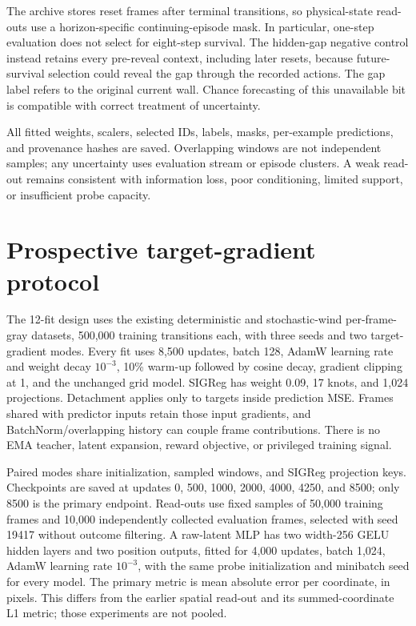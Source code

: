 The archive stores reset frames after terminal transitions, so physical-state read-outs use a
horizon-specific continuing-episode mask. In particular, one-step evaluation does not select for
eight-step survival. The hidden-gap negative control instead retains every pre-reveal context,
including later resets, because future-survival selection could reveal the gap through the recorded
actions. The gap label refers to the original current wall. Chance forecasting of this unavailable
bit is compatible with correct treatment of uncertainty.

All fitted weights, scalers, selected IDs, labels, masks, per-example predictions, and provenance
hashes are saved. Overlapping windows are not independent samples; any uncertainty uses evaluation
stream or episode clusters. A weak read-out remains consistent with information loss, poor
conditioning, limited support, or insufficient probe capacity.

\section{Prospective target-gradient protocol}
\label{app:target}
The 12-fit design uses the existing deterministic and stochastic-wind per-frame-gray datasets,
500,000 training transitions each, with three seeds and two target-gradient modes. Every fit uses
8,500 updates, batch 128, AdamW learning rate and weight decay $10^{-3}$, 10\% warm-up followed by
cosine decay, gradient clipping at 1, and the unchanged grid model. SIGReg has weight 0.09,
17 knots, and 1,024 projections. Detachment applies only to targets inside prediction MSE. Frames
shared with predictor inputs retain those input gradients, and BatchNorm/overlapping history can
couple frame contributions. There is no EMA teacher, latent expansion, reward objective, or
privileged training signal.

Paired modes share initialization, sampled windows, and SIGReg projection keys. Checkpoints are
saved at updates 0, 500, 1000, 2000, 4000, 4250, and 8500; only 8500 is the primary endpoint.
Read-outs use fixed samples of 50,000 training frames and 10,000 independently collected evaluation
frames, selected with seed 19417 without outcome filtering. A raw-latent MLP has two width-256 GELU
hidden layers and two position outputs, fitted for 4,000 updates, batch 1,024, AdamW learning rate
$10^{-3}$, with the same probe initialization and minibatch seed for every model. The primary metric
is mean absolute error per coordinate, in pixels. This differs from the earlier spatial read-out
and its summed-coordinate L1 metric; those experiments are not pooled.

